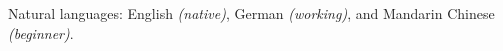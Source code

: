 \documentclass[10pt,a4paper]{article} %
\begin{document}
\spacedhrule{1.6em}{-0.4em} %


\inlineheadsection %
{Natural languages:}
{English \textit{(native)}, German \textit{(working)}, and Mandarin Chinese \textit{(beginner)}.}

\end{document}
